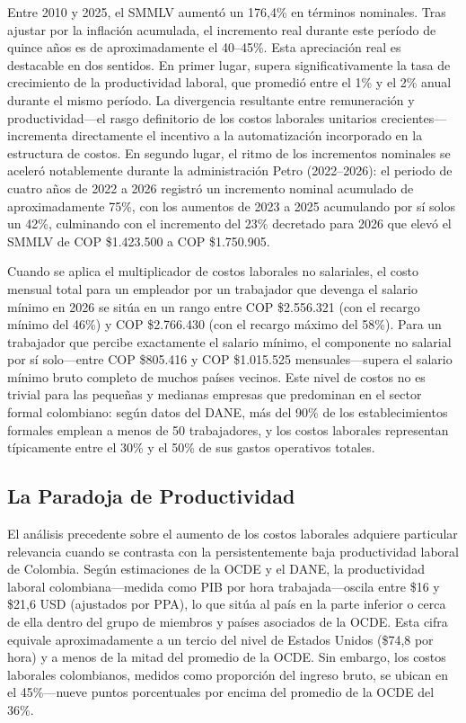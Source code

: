 \documentclass{article}
\begin{document}
Entre 2010 y 2025, el SMMLV aument\'o un 176,4\% en t\'erminos nominales. Tras ajustar por la inflaci\'on acumulada, el incremento real durante este per\'iodo de quince a\~nos es de aproximadamente el 40--45\%. Esta apreciaci\'on real es destacable en dos sentidos. En primer lugar, supera significativamente la tasa de crecimiento de la productividad laboral, que promedi\'o entre el 1\% y el 2\% anual durante el mismo per\'iodo. La divergencia resultante entre remuneraci\'on y productividad---el rasgo definitorio de los costos laborales unitarios crecientes---incrementa directamente el incentivo a la automatizaci\'on incorporado en la estructura de costos. En segundo lugar, el ritmo de los incrementos nominales se aceler\'o notablemente durante la administraci\'on Petro (2022--2026): el periodo de cuatro a\~nos de 2022 a 2026 registr\'o un incremento nominal acumulado de aproximadamente 75\%, con los aumentos de 2023 a 2025 acumulando por s\'i solos un 42\%, culminando con el incremento del 23\% decretado para 2026 que elev\'o el SMMLV de COP \$1.423.500 a COP \$1.750.905.

Cuando se aplica el multiplicador de costos laborales no salariales, el costo mensual total para un empleador por un trabajador que devenga el salario m\'inimo en 2026 se sit\'ua en un rango entre COP \$2.556.321 (con el recargo m\'inimo del 46\%) y COP \$2.766.430 (con el recargo m\'aximo del 58\%). Para un trabajador que percibe exactamente el salario m\'inimo, el componente no salarial por s\'i solo---entre COP \$805.416 y COP \$1.015.525 mensuales---supera el salario m\'inimo bruto completo de muchos pa\'ises vecinos. Este nivel de costos no es trivial para las peque\~nas y medianas empresas que predominan en el sector formal colombiano: seg\'un datos del DANE, m\'as del 90\% de los establecimientos formales emplean a menos de 50 trabajadores, y los costos laborales representan t\'ipicamente entre el 30\% y el 50\% de sus gastos operativos totales.


\subsection{La Paradoja de Productividad}
\label{subsec:productivity_paradox}

El an\'alisis precedente sobre el aumento de los costos laborales adquiere particular relevancia cuando se contrasta con la persistentemente baja productividad laboral de Colombia. Seg\'un estimaciones de la OCDE y el DANE, la productividad laboral colombiana---medida como PIB por hora trabajada---oscila entre \$16 y \$21,6 USD (ajustados por PPA), lo que sit\'ua al pa\'is en la parte inferior o cerca de ella dentro del grupo de miembros y pa\'ises asociados de la OCDE. Esta cifra equivale aproximadamente a un tercio del nivel de Estados Unidos (\$74,8 por hora) y a menos de la mitad del promedio de la OCDE. Sin embargo, los costos laborales colombianos, medidos como proporci\'on del ingreso bruto, se ubican en el 45\%---nueve puntos porcentuales por encima del promedio de la OCDE del 36\%.
\end{document}
